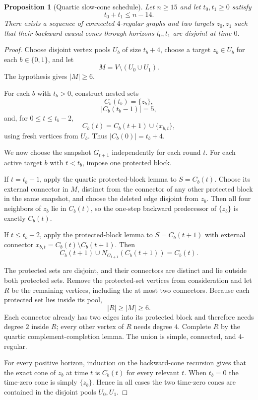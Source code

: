 \documentclass[11pt]{article}
\newtheorem{proposition}{Proposition}
\theoremstyle{remark}
\begin{document}
\begin{proposition}[Quartic slow-cone schedule]
Let $n\ge15$ and let $t_0,t_1\ge0$ satisfy
\[
t_0+t_1\le n-14.
\]
There exists a sequence of connected $4$-regular graphs and two targets
$z_0,z_1$ such that their backward causal cones through horizons $t_0,t_1$
are disjoint at time $0$.
\end{proposition}

\begin{proof}
Choose disjoint vertex pools $U_b$ of size $t_b+4$, choose a target
$z_b\in U_b$ for each $b\in\{0,1\}$, and let
\[
M=V\setminus(U_0\cup U_1).
\]
The hypothesis gives $|M|\ge6$.

For each $b$ with $t_b>0$, construct nested sets
\[
C_b(t_b)=\{z_b\},
\]
\[
|C_b(t_b-1)|=5,
\]
and, for $0\le t\le t_b-2$,
\[
C_b(t)=C_b(t+1)\cup\{x_{b,t}\},
\]
using fresh vertices from $U_b$.  Thus $|C_b(0)|=t_b+4$.

We now choose the snapshot $G_{t+1}$ independently for each round $t$.
For each active target $b$ with $t<t_b$, impose one protected block.

If $t=t_b-1$, apply the quartic protected-block lemma to
$S=C_b(t)$.  Choose its external connector in $M$, distinct from the connector
of any other protected block in the same snapshot, and choose the deleted edge
disjoint from $z_b$.  Then all four neighbors of $z_b$ lie in $C_b(t)$, so the
one-step backward predecessor of $\{z_b\}$ is exactly $C_b(t)$.

If $t\le t_b-2$, apply the protected-block lemma to
$S=C_b(t+1)$ with external connector
$x_{b,t}=C_b(t)\setminus C_b(t+1)$.  Then
\[
C_b(t+1)\cup N_{G_{t+1}}(C_b(t+1))=C_b(t).
\]

The protected sets are disjoint, and their connectors are distinct and lie
outside both protected sets.  Remove the protected-set vertices from consideration
and let $R$ be the remaining vertices, including the at most two connectors.
Because each protected set lies inside its pool,
\[
|R|\ge |M|\ge6.
\]
Each connector already has two edges into its protected block and therefore needs
degree $2$ inside $R$; every other vertex of $R$ needs degree $4$.
Complete $R$ by the quartic complement-completion lemma.
The union is simple, connected, and $4$-regular.

For every positive horizon, induction on the backward-cone recursion gives that the
exact cone of $z_b$ at time $t$ is $C_b(t)$ for every relevant $t$.  When $t_b=0$
the time-zero cone is simply $\{z_b\}$.  Hence in all cases the two time-zero
cones are contained in the disjoint pools $U_0,U_1$.
\end{proof}
\end{document}
